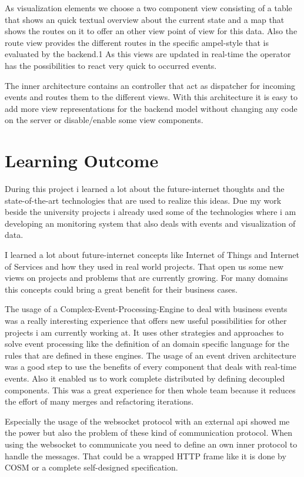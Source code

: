 \documentclass{acm_proc_article-sp}
\begin{document}
As visualization elements we choose a two component view consisting of a table that shows an quick textual overview about the current state and a map that shows the routes on it to offer an other view point of view for this data. Also the route view provides the different routes in the specific ampel-style that is evaluated by the backend.1
As this views are updated in real-time the operator has the possibilities to react very quick to occurred events.

The inner architecture contains an controller that act as dispatcher for incoming events and routes them to the different views. With this architecture it is easy to add more view representations for the backend model without changing any code on the server or disable/enable some view components.
		
\section{Learning Outcome}
During this project i learned a lot about the future-internet thoughts and the state-of-the-art technologies that are used to realize this ideas.
Due my work beside the university projects i already used some of the technologies where i am developing an monitoring system that also deals with events and visualization of data.

I learned a lot about future-internet concepts like Internet of Things and Internet of Services and how they used in real world projects. That open us some new views on projects and problems that are currently growing. For many domains this concepts could bring a great benefit for their business cases.

The usage of a Complex-Event-Processing-Engine to deal with business events was a really interesting experience that offers new useful possibilities for other projects i am currently working at. It uses other strategies and approaches to solve event processing like the definition of an domain specific language for the rules that are defined in these engines.
The usage of an event driven architecture was a good step to use the benefits of every component that deals with real-time events. Also it enabled us to work complete distributed by defining decoupled components. This was a great experience for then whole team because it reduces the effort of many merges and refactoring iterations.

Especially the usage of the websocket protocol with an external api showed me the power but also the problem of these kind of communication protocol. When using the websocket  to communicate you need to define an own inner protocol to handle the messages. 
That could be a wrapped HTTP frame like it is done by COSM or a complete self-designed specification.
\end{document}
